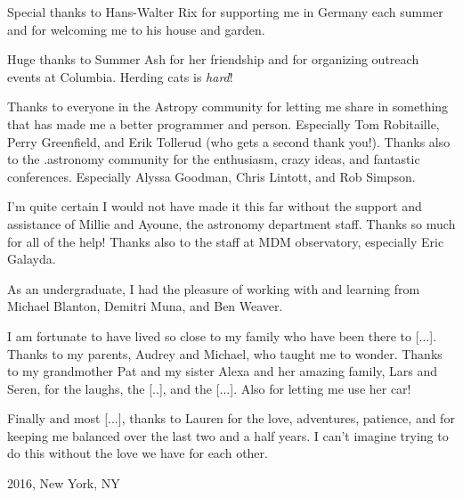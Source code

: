 Special thanks to Hans-Walter Rix for supporting me in Germany each summer and
for welcoming me to his house and garden.

Huge thanks to Summer Ash for her friendship and for organizing outreach events
at Columbia. Herding cats is \emph{hard}!

Thanks to everyone in the Astropy community for letting me share in something
that has made me a better programmer and person. Especially Tom Robitaille,
Perry Greenfield, and Erik Tollerud (who gets a second thank you!). Thanks also
to the .astronomy community for the enthusiasm, crazy ideas, and fantastic
conferences. Especially Alyssa Goodman, Chris Lintott, and Rob Simpson.

I'm quite certain I would not have made it this far without the support and
assistance of Millie and Ayoune, the astronomy department staff. Thanks so much
for all of the help! Thanks also to the staff at MDM observatory, especially
Eric Galayda.

As an undergraduate, I had the pleasure of working with and learning from
Michael Blanton, Demitri Muna, and Ben Weaver.

I am fortunate to have lived so close to my family who have been there to [...]. Thanks to my parents, Audrey and Michael, who taught me to wonder. Thanks to my grandmother Pat and my sister Alexa and her amazing family, Lars and Seren, for the laughs, the [..], and the [...]. Also for letting me use her car!

Finally and most [...], thanks to Lauren for the love, adventures, patience, and for keeping me balanced over the last two and a half years. I can't imagine trying to do this without the love we have for each other.

\vspace{1.8cm}
2016, New York, NY

